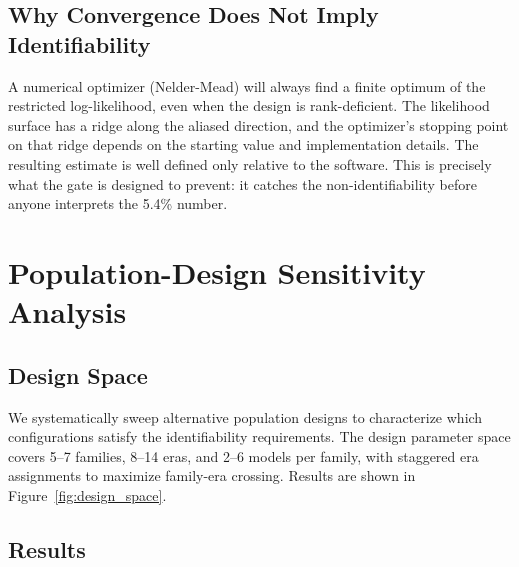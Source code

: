 \documentclass[journal]{IEEEtran}
\begin{document}
\subsection{Why Convergence Does Not Imply Identifiability}

A numerical optimizer (Nelder-Mead) will always find a finite optimum of the restricted log-likelihood, even when the design is rank-deficient. The likelihood surface has a ridge along the aliased direction, and the optimizer's stopping point on that ridge depends on the starting value and implementation details. The resulting estimate is well defined only relative to the software. This is precisely what the gate is designed to prevent: it catches the non-identifiability before anyone interprets the 5.4\% number.

\section{Population-Design Sensitivity Analysis}
\label{sec:design_sensitivity}

\subsection{Design Space}

We systematically sweep alternative population designs to characterize which configurations satisfy the identifiability requirements. The design parameter space covers 5--7 families, 8--14 eras, and 2--6 models per family, with staggered era assignments to maximize family-era crossing. Results are shown in Figure~\ref{fig:design_space}.

\subsection{Results}
\end{document}
